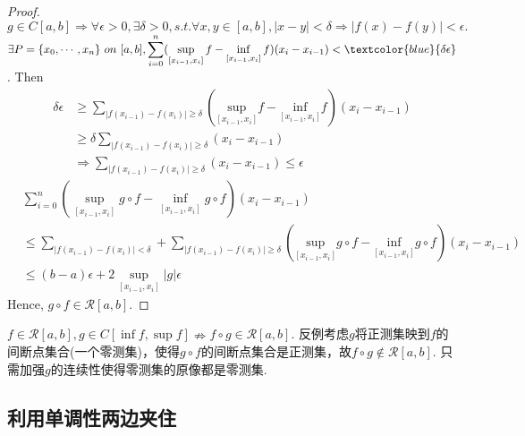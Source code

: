 \begin{proof}
    $g\in C[a,b]\Rightarrow \forall \epsilon>0,\exists \delta>0,s.t.\forall x,y\in [a,b],\left|x-y\right|<\delta\Rightarrow \left|f(x)-f(y)\right|<\epsilon.$
    \\
    $\displaystyle \exists P=\{x_0,\cdots,x_n\}\ on\ [a,b], \sum_{i=0}^{n}(\sup_{[x_{i-1},x_i]}f-\inf_{[x_{i-1},x_{i}]}f)(x_i-x_{i-1})<\textcolor{blue}{\delta \epsilon}$. Then
    \begin{align*}
        \delta \epsilon
        &\ge \sum_{\left| f\left( x_{i-1} \right) -f\left( x_i \right) \right|\ge \delta}{\left( \underset{\left[ x_{i-1},x_i \right]}{\mathrm{sup}} f-\underset{\left[ x_{i-1},x_i \right]}{\mathrm{inf}} f \right)\left( x_i-x_{i-1} \right)}\\
        &\ge \delta \sum_{\left| f\left( x_{i-1} \right) -f\left( x_i \right) \right|\ge \delta}{\left( x_i-x_{i-1} \right)}\\
        &\Rightarrow \sum_{\left| f\left( x_{i-1} \right) -f\left( x_i \right) \right|\ge \delta}{\left( x_i-x_{i-1} \right)}\le \epsilon
    \end{align*}
    \begin{align*}
        &\sum_{i=0}^{n}\left(\sup_{[x_{i-1},x_i]}g\circ f-\inf_{[x_{i-1},x_{i}]}g\circ f\right)(x_i-x_{i-1})\\
        &\le \sum_{\left| f\left( x_{i-1} \right) -f\left( x_i \right) \right|<\delta}+\sum_{\left| f\left( x_{i-1} \right) -f\left( x_i \right) \right|\ge \delta}{\left( \underset{\left[ x_{i-1},x_i \right]}{\mathrm{sup}}g\circ f-\underset{\left[ x_{i-1},x_i \right]}{\mathrm{inf}}g\circ f \right)\left( x_i-x_{i-1} \right)} \\
        &\le (b-a)\epsilon +2\sup_{[x_{i-1},x_i]} \left|g\right|\epsilon
    \end{align*}
    Hence, $g\circ f\in \mathscr{R}[a,b]$.
\end{proof}

\begin{note}
    $f\in \mathscr{R}[a,b],g\in C[\inf f,\sup f]\nRightarrow f\circ g\in \mathscr{R}[a,b]$. 反例考虑$g$将正测集映到$f$的间断点集合(一个零测集)，使得$g\circ f$的间断点集合是正测集，故$f\circ g\notin \mathscr{R}[a,b]$. 只需加强$g$的连续性使得零测集的原像都是零测集.
\end{note}

\subsection{利用单调性两边夹住}


